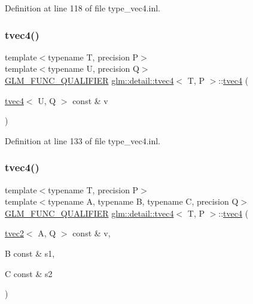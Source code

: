 Definition at line 118 of file type\+\_\+vec4.\+inl.

\mbox{\label{structglm_1_1detail_1_1tvec4_a6862f9f921f782523d5d9bfb099ce621}} 
\subsubsection{\texorpdfstring{tvec4()}{tvec4()}\hspace{0.1cm}{\footnotesize\ttfamily [17/23]}}
{\footnotesize\ttfamily template$<$typename T, precision P$>$ \\
template$<$typename U, precision Q$>$ \\
\hyperlink{setup_8hpp_a33fdea6f91c5f834105f7415e2a64407}{G\+L\+M\+\_\+\+F\+U\+N\+C\+\_\+\+Q\+U\+A\+L\+I\+F\+I\+ER} \hyperlink{structglm_1_1detail_1_1tvec4}{glm\+::detail\+::tvec4}$<$ T, P $>$\+::\hyperlink{structglm_1_1detail_1_1tvec4}{tvec4} (\begin{DoxyParamCaption}\item[{\hyperlink{structglm_1_1detail_1_1tvec4}{tvec4}$<$ U, Q $>$ const \&}]{v }\end{DoxyParamCaption})}



Definition at line 133 of file type\+\_\+vec4.\+inl.

\mbox{\label{structglm_1_1detail_1_1tvec4_a88c6b7ecdef152cdf340eaf39b4e4606}} 
\subsubsection{\texorpdfstring{tvec4()}{tvec4()}\hspace{0.1cm}{\footnotesize\ttfamily [18/23]}}
{\footnotesize\ttfamily template$<$typename T, precision P$>$ \\
template$<$typename A, typename B, typename C, precision Q$>$ \\
\hyperlink{setup_8hpp_a33fdea6f91c5f834105f7415e2a64407}{G\+L\+M\+\_\+\+F\+U\+N\+C\+\_\+\+Q\+U\+A\+L\+I\+F\+I\+ER} \hyperlink{structglm_1_1detail_1_1tvec4}{glm\+::detail\+::tvec4}$<$ T, P $>$\+::\hyperlink{structglm_1_1detail_1_1tvec4}{tvec4} (\begin{DoxyParamCaption}\item[{\hyperlink{structglm_1_1detail_1_1tvec2}{tvec2}$<$ A, Q $>$ const \&}]{v,  }\item[{B const \&}]{s1,  }\item[{C const \&}]{s2 }\end{DoxyParamCaption})}



